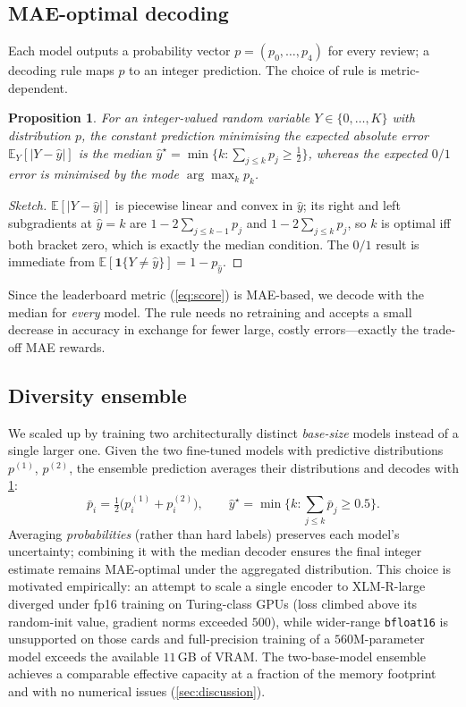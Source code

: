 \documentclass{article}
\theoremstyle{plain}
\newtheorem{proposition}[theorem]{Proposition}
\theoremstyle{definition}
\theoremstyle{remark}
\begin{document}
\subsection{MAE-optimal decoding}
\label{sec:decoding}
Each model outputs a probability vector $p=(p_0,\dots,p_4)$ for every
review; a decoding rule maps $p$ to an integer prediction. The
choice of rule is metric-dependent.

\begin{proposition}
\label{prop:median}
For an integer-valued random variable $Y\in\{0,\dots,K\}$ with
distribution $p$, the constant prediction minimising the expected
absolute error $\mathbb{E}_Y[|Y-\hat y|]$ is the \emph{median}
$\hat y^\star=\min\{k:\sum_{j\le k}p_j\geq \tfrac{1}{2}\}$, whereas the
expected $0/1$ error is minimised by the mode $\arg\max_k p_k$.
\end{proposition}

\begin{proof}[Sketch]
$\mathbb{E}[|Y-\hat y|]$ is piecewise linear and convex in $\hat y$;
its right and left subgradients at $\hat y=k$ are
$1-2\!\sum_{j\le k-1}p_j$ and $1-2\!\sum_{j\le k}p_j$, so $k$ is
optimal iff both bracket zero, which is exactly the median condition.
The $0/1$ result is immediate from
$\mathbb{E}[\mathbf{1}\{Y\neq\hat y\}]=1-p_{\hat y}$.
\end{proof}

Since the leaderboard metric (\cref{eq:score}) is MAE-based, we decode
with the median for \emph{every} model. The rule needs no retraining
and accepts a small decrease in accuracy in exchange for fewer large,
costly errors---exactly the trade-off MAE rewards.

\subsection{Diversity ensemble}
\label{sec:ensemble}
We scaled up by training two architecturally distinct
\emph{base-size} models instead of a single larger one. Given the two
fine-tuned models with predictive distributions $p^{(1)}$, $p^{(2)}$,
the ensemble prediction averages their distributions and decodes with
\cref{prop:median}:
\begin{equation}
\label{eq:ensemble}
\bar p_i=\tfrac{1}{2}\big(p^{(1)}_i+p^{(2)}_i\big),\qquad
\hat y^\star = \min\{k:\textstyle\sum_{j\le k}\bar p_j\geq 0.5\}.
\end{equation}
Averaging \emph{probabilities} (rather than hard labels) preserves
each model's uncertainty; combining it with the median decoder
ensures the final integer estimate remains MAE-optimal under the
aggregated distribution. This choice is motivated empirically: an
attempt to scale a single encoder to XLM-R-large diverged under fp16
training on Turing-class GPUs (loss climbed above its random-init
value, gradient norms exceeded $500$), while wider-range
\texttt{bfloat16} is unsupported on those cards and full-precision
training of a $560$M-parameter model exceeds the available
$11$\,GB of VRAM. The two-base-model ensemble achieves a comparable
effective capacity at a fraction of the memory footprint and with no
numerical issues (\cref{sec:discussion}).
\end{document}

